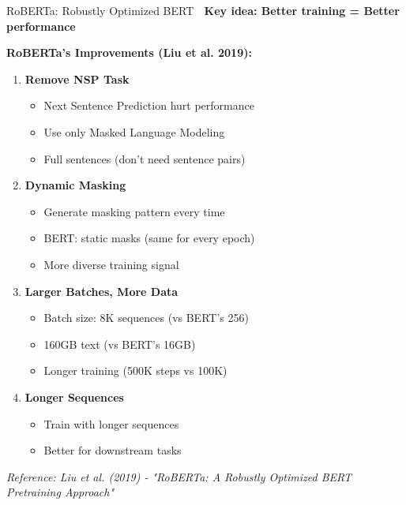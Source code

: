 \documentclass[aspectratio=169]{beamer}
\begin{document}
\begin{frame}[shrink=10]{RoBERTa: Robustly Optimized BERT 🚀}
\textbf{Key idea: Better training = Better performance}

\vspace{1em}

\textbf{RoBERTa's Improvements (Liu et al. 2019):}

\begin{enumerate}\setlength{\itemsep}{0pt}
    \item \textbf{Remove NSP Task}
    \begin{itemize}\setlength{\itemsep}{0pt}
        \item Next Sentence Prediction hurt performance
        \item Use only Masked Language Modeling
        \item Full sentences (don't need sentence pairs)
    \end{itemize}

    \vspace{0.5em}

    \item \textbf{Dynamic Masking}
    \begin{itemize}\setlength{\itemsep}{0pt}
        \item Generate masking pattern every time
        \item BERT: static masks (same for every epoch)
        \item More diverse training signal
    \end{itemize}

    \vspace{0.5em}

    \item \textbf{Larger Batches, More Data}
    \begin{itemize}\setlength{\itemsep}{0pt}
        \item Batch size: 8K sequences (vs BERT's 256)
        \item 160GB text (vs BERT's 16GB)
        \item Longer training (500K steps vs 100K)
    \end{itemize}

    \vspace{0.5em}

    \item \textbf{Longer Sequences}
    \begin{itemize}\setlength{\itemsep}{0pt}
        \item Train with longer sequences
        \item Better for downstream tasks
    \end{itemize}
\end{enumerate}

\small
\textit{Reference: Liu et al. (2019) - "RoBERTa: A Robustly Optimized BERT Pretraining Approach"}
\end{frame}
\end{document}
